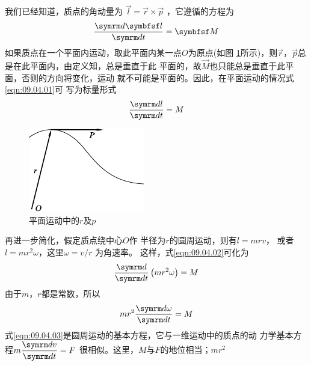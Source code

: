 \section[转动惯量]{}\label{sec:09.04}

我们已经知道，质点的角动量为 $ \vec{ l } = \vec{ r } \times \vec{ p }$ ，它遵循的方程为
\begin{equation}\label{eqn:09.04.01}
  \frac { \dif \vec{l} } { \dif t } = \vec{M}
\end{equation}
如果质点在一个平面内运动，取此平面内某一点$ O $为原点(如图
\ref{fig:09.10}所示)，则$ \vec{ r } $，$ \vec{ p } $总是在此平面内，由定义知，总是垂直于此
平面的，故$ \vec{M} $也只能总是垂直于此平面，否则的方向将变化，运动
\clearpage\noindent
就不可能是平面的。因此，在平面运动的情况\lhbrak 式\eqref{eqn:09.04.01}\rhbrak 可
写为标量形式
\begin{equation}\label{eqn:09.04.02}
  \frac { \dif l } { \dif t } = M
\end{equation}
\begin{figure}
  \centering
  \includegraphics{figure/fig09.10}
  \caption{平面运动中的$ r $及$ p $}
  \label{fig:09.10}
\end{figure}
再进一步简化，假定质点绕中心$ O $作
半径为$ r $的圆周运动，则有$ l = m r v $，
或者$ l = m r ^ { 2 } \omega $，这里$ \omega = v / r $ 为角速率。
这样，式\eqref{eqn:09.04.02}可化为
\begin{equation*}
  \frac { \dif } { \dif t } \left( m r ^ { 2 } \omega \right) = M
\end{equation*}
由于$ m $，$ r $都是常数，所以
\begin{equation}\label{eqn:09.04.03}
  m r ^ { 2 } \frac { \dif \omega } { \dif t } = M
\end{equation}
式\eqref{eqn:09.04.03}是圆周运动的基本方程，它与一维运动中的质点的动
力学基本方程$ m \dfrac { \dif v } { \dif t } = F $ 很相似。这里，$ M $与$ F $的地位相当；$ m r ^ 2 $

